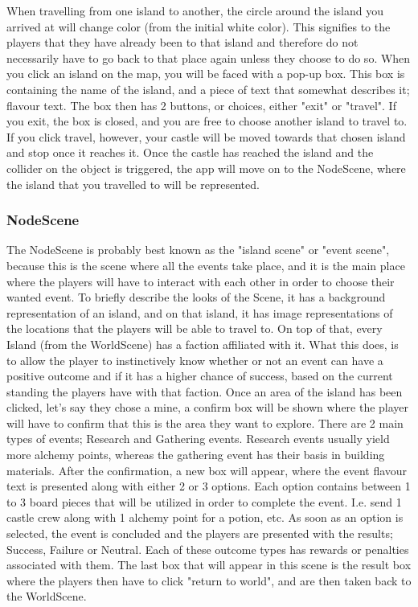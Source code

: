When travelling from one island to another, the circle around the island you arrived at will change color (from the initial white color). This signifies to the players that they have already been to that island and therefore do not necessarily have to go back to that place again unless they choose to do so.
When you click an island on the map, you will be faced with a pop-up box. This box is containing the name of the island, and a piece of text that somewhat describes it; flavour text. The box then has 2 buttons, or choices, either "exit" or "travel". If you exit, the box is closed, and you are free to choose another island to travel to. If you click travel, however, your castle will be moved towards that chosen island and stop once it reaches it. 
Once the castle has reached the island and the collider on the object is triggered, the app will move on to the NodeScene, where the island that you travelled to will be represented.

\subsubsection{NodeScene}
\label{sec:nodeScene}
The NodeScene is probably best known as the "island scene" or "event scene", because 
this is the scene where all the events take place, and it is the main place where the players will have to interact with each other in order to choose their wanted event. 
To briefly describe the looks of the Scene, it has a background representation of an island, and on that island, it has image representations of the locations that the players will be able to travel to. On top of that, every Island (from the WorldScene) has a faction affiliated with it. What this does, is to allow the player to instinctively know whether or not an event can have a positive outcome and if it has a higher chance of success, based on the current standing the players have with that faction.
Once an area of the island has been clicked, let's say they chose a mine, a confirm box will be shown where the player will have to confirm that this is the area they want to explore. 
There are 2 main types of events; Research and Gathering events. Research events usually yield more alchemy points, whereas the gathering event has their basis in building materials.
After the confirmation, a new box will appear, where the event flavour text is presented along with either 2 or 3 options. Each option contains between 1 to 3 board pieces that will be utilized in order to complete the event. I.e. send 1 castle crew along with 1 alchemy point for a potion, etc. As soon as an option is selected, the event is concluded and the players are presented with the results; Success, Failure or Neutral. Each of these outcome types has rewards or penalties associated with them.
The last box that will appear in this scene is the result box where the players then have to click "return to world", and are then taken back to the WorldScene. 

